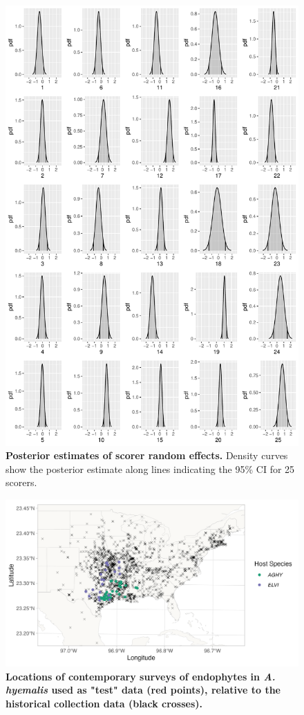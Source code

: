 \documentclass[11pt]{article}
\begin{document}
\begin{figure}[H]
	\centering
	\includegraphics[width = .8\linewidth]{../Plots/scorer_posterior_plot.pdf}
	\caption{\textbf{Posterior estimates of scorer random effects.} Density curves show the posterior estimate along lines indicating the 95\% CI for 25 scorers.}
	\label{fig:scorer_fx}
\end{figure}


\begin{figure}[H]
	\centering
	\includegraphics[width = \linewidth]{../Plots/contemp_surveys_map.png}
	\caption{\textbf{Locations of contemporary surveys of endophytes in \emph{A. hyemalis} used as "test" data (red points), relative to the historical collection data (black crosses).}}
	\label{fig:contempsurveysmap}
\end{figure}
\end{document}
